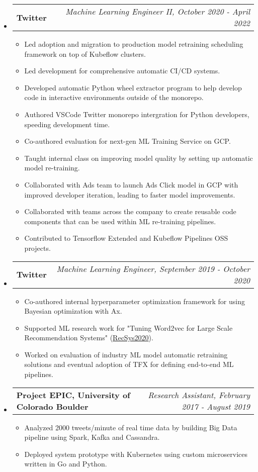 \documentclass[letterpaper,10pt]{article}
\makeatletter
\newcommand{\resitem}[1]{\item #1 \vspace{-2pt}}
\newcommand{\ressubheading}[4]{
\begin{tabular*}{7.0in}{l@{\extracolsep{\fill}}r}
		\textbf{#1} & \textit{#4} \\
\end{tabular*}\vspace{-6pt}}
\makeatother
\begin{document}
\begin{itemize}
\begin{itemize}
			\end{itemize}
		\item
			\ressubheading{Twitter}{Boulder, CO}{Machine Learning Engineer II}{Machine Learning Engineer II, October 2020 - April 2022}
			\begin{itemize}
				\resitem{Led adoption and migration to production model retraining scheduling framework on top of Kubeflow clusters.}
				\resitem{Led development for comprehensive automatic CI/CD systems. } 
				\resitem{Developed automatic Python wheel extractor program to help develop code in interactive environments outside of the monorepo.}
				\resitem{Authored VSCode Twitter monorepo intergration for Python developers, speeding development time.}
				\resitem{Co-authored evaluation for next-gen ML Training Service on GCP.}
				\resitem{Taught internal class on improving model quality by setting up automatic model re-training.}
				\resitem{Collaborated with Ads team to launch Ads Click model in GCP with improved developer iteration, leading to faster model improvements.}
			    \resitem{Collaborated with teams across the company to create reusable code components that can be used within ML re-training pipelines.}
				\resitem{Contributed to Tensorflow Extended and Kubeflow Pipelines OSS projects.}
			\end{itemize}
		\item
			\ressubheading{Twitter}{Boulder, CO}{Machine Learning Engineer}{Machine Learning Engineer, September 2019 - October 2020}
			\begin{itemize}
				\resitem{Co-authored internal hyperparameter optimization framework for using Bayesian optimization with Ax.}
				\resitem{Supported ML research work for "Tuning Word2vec for Large Scale Recommendation Systems" (\href{https://arxiv.org/pdf/2009.12192.pdf}{RecSys2020}).}
				\resitem{Worked on evaluation of industry ML model automatic retraining solutions and eventual adoption of TFX for defining end-to-end ML pipelines.}
			\end{itemize}
		\item
			\ressubheading{Project EPIC, University of Colorado Boulder}{Boulder, CO}{Research Assistant}{Research Assistant, February 2017 - August 2019}
			\begin{itemize}
				\resitem{Analyzed 2000 tweets/minute of real time data by building Big Data pipeline using Spark, Kafka and Cassandra.} 
				\resitem{Deployed system prototype with Kubernetes using custom microservices written in Go and Python.}
			\end{itemize}

\end{itemize}
\end{document}
